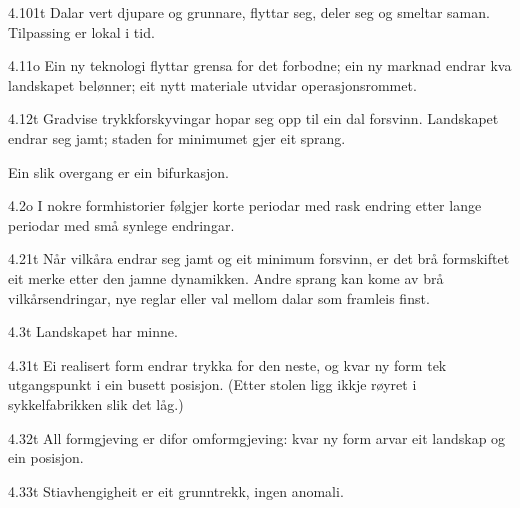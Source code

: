 \begin{formproposition}{4.101}{t}
Dalar vert djupare og grunnare, flyttar seg, deler seg og smeltar saman. Tilpassing er lokal i tid.
\end{formproposition}

\begin{formproposition}{4.11}{o}
Ein ny teknologi flyttar grensa for det forbodne; ein ny marknad endrar kva landskapet belønner; eit nytt materiale utvidar operasjonsrommet.
\end{formproposition}

\begin{formproposition}{4.12}{t}
Gradvise trykkforskyvingar hopar seg opp til ein dal forsvinn. Landskapet endrar seg jamt; staden for minimumet gjer eit sprang.

Ein slik overgang er ein bifurkasjon.
\end{formproposition}

\begin{formproposition}{4.2}{o}
I nokre formhistorier følgjer korte periodar med rask endring etter lange periodar med små synlege endringar.
\end{formproposition}

\begin{formproposition}{4.21}{t}
Når vilkåra endrar seg jamt og eit minimum forsvinn, er det brå formskiftet eit merke etter den jamne dynamikken. Andre sprang kan kome av brå vilkårsendringar, nye reglar eller val mellom dalar som framleis finst.
\end{formproposition}

\begin{formproposition}{4.3}{t}
Landskapet har minne.
\end{formproposition}

\begin{formproposition}{4.31}{t}
Ei realisert form endrar trykka for den neste, og kvar ny form tek utgangspunkt i ein busett posisjon. (Etter stolen ligg ikkje røyret i sykkelfabrikken slik det låg.)
\end{formproposition}

\begin{formproposition}{4.32}{t}
All formgjeving er difor omformgjeving: kvar ny form arvar eit landskap og ein posisjon.
\end{formproposition}

\begin{formproposition}{4.33}{t}
Stiavhengigheit er eit grunntrekk, ingen anomali.
\end{formproposition}

